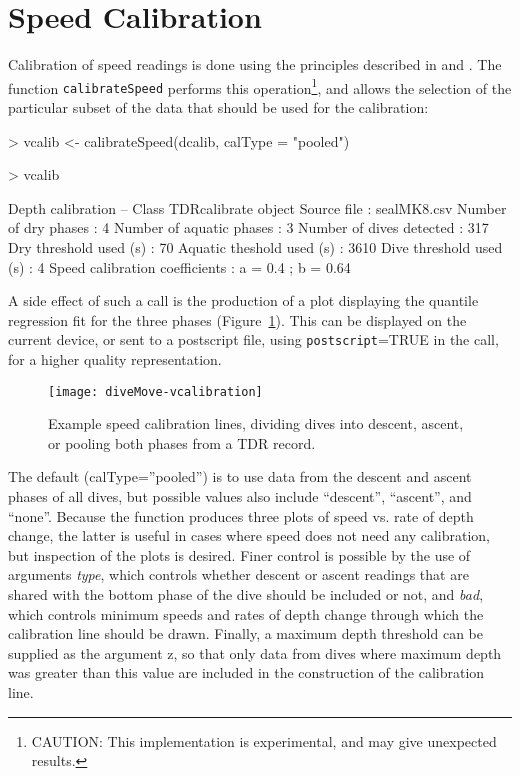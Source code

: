 \documentclass[12pt, letterpaper]{scrartcl}
\newcommand{\Rfunction}[1]{{\texttt{#1}}}
\newcommand{\Rfunarg}[1]{{\textit{#1}}}
\begin{document}
\section{Speed Calibration}
\label{sec:speed}

Calibration of speed readings is done using the principles described in
\citet{1929} and \citet{1291}.  The function \Rfunction{calibrateSpeed}
performs this operation\footnote{CAUTION: This implementation is
  experimental, and may give unexpected results.}, and allows the
selection of the particular subset of the data that should be used for the
calibration:

\begin{Schunk}
\begin{Sinput}
> vcalib <- calibrateSpeed(dcalib, calType = "pooled")
\end{Sinput}
\end{Schunk}
\begin{Schunk}
\begin{Sinput}
> vcalib
\end{Sinput}
\begin{Soutput}
Depth calibration -- Class TDRcalibrate object
  Source file                       : sealMK8.csv 
  Number of dry phases              : 4 
  Number of aquatic phases          : 3 
  Number of dives detected          : 317 
  Dry threshold used (s)            : 70 
  Aquatic theshold used (s)         : 3610 
  Dive threshold used (s)           : 4 
  Speed calibration coefficients : a = 0.4 ; b = 0.64 
\end{Soutput}
\end{Schunk}
A side effect of such a call is the production of a plot displaying the
quantile regression fit for the three phases (Figure~\ref{fig:rqplots}).
This can be displayed on the current device, or sent to a postscript file,
using \Rfunction{postscript}=TRUE in the call, for a higher quality
representation.

\begin{figure}[hbtp]
  \centering
  \texttt{[image: diveMove-vcalibration]}
  \caption{Example speed calibration lines, dividing dives into
    descent, ascent, or pooling both phases from a TDR record.}
  \label{fig:rqplots}
\end{figure}

The default (calType=''pooled'') is to use data from the descent and
ascent phases of all dives, but possible values also include ``descent'',
``ascent'', and ``none''.  Because the function produces three plots of
speed vs. rate of depth change, the latter is useful in cases where speed
does not need any calibration, but inspection of the plots is desired.
Finer control is possible by the use of arguments \Rfunarg{type}, which
controls whether descent or ascent readings that are shared with the
bottom phase of the dive should be included or not, and \Rfunarg{bad},
which controls minimum speeds and rates of depth change through which the
calibration line should be drawn.  Finally, a maximum depth threshold can
be supplied as the argument z, so that only data from dives where maximum
depth was greater than this value are included in the construction of the
calibration line.
\end{document}
